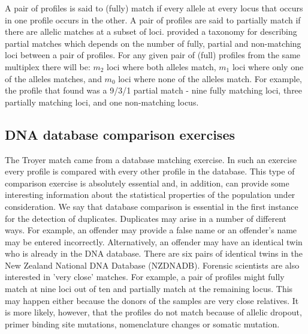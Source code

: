 \documentclass[a4paper,11pt]{article}
\begin{document}
A pair of profiles is said to (fully) match if every allele at every
locus that occurs in one profile occurs in the other. A pair of
profiles are said to partially match if there are allelic matches at a
subset of loci.  \cite{weir2004} provided a taxonomy for describing
partial matches which depends on the number of fully, partial and
non-matching loci between a pair of profiles. For any given pair of
(full) profiles from the same multiplex there will be: $m_2$ loci
where both alleles match, $m_1$ loci where only one of the alleles
matches, and $m_0$ loci where none of the alleles match. For example,
the profile that \cite{troyer2001} found was a 9/3/1 partial match -
nine fully matching loci, three partially matching loci, and one
non-matching locus.

\subsection[Database comparisons]{DNA database comparison exercises}
\label{sec:dna-comp-exerc}
The Troyer match came from a database matching exercise. In such an
exercise every profile is compared with every other profile in the
database. This type of comparison exercise is absolutely essential
and, in addition, can provide some interesting information about the
statistical properties of the population under consideration. We say
that database comparison is essential in the first instance for the
detection of duplicates. Duplicates may arise in a number of different
ways. For example, an offender may provide a false name or an
offender's name may be entered incorrectly. Alternatively, an offender
may have an identical twin who is already in the DNA database. There
are six pairs of identical twins in the New Zealand National DNA
Database (NZDNADB). Forensic
scientists are also interested in 'very close' matches. 
For example, a pair of profiles
might fully match at nine loci out of ten and partially match at the
remaining locus. This may happen either because the donors of the
samples are very close relatives. It is  more likely, however, that
the profiles do not match because of allelic dropout,
primer binding site mutations, nomenclature changes or somatic mutation.
\end{document}
